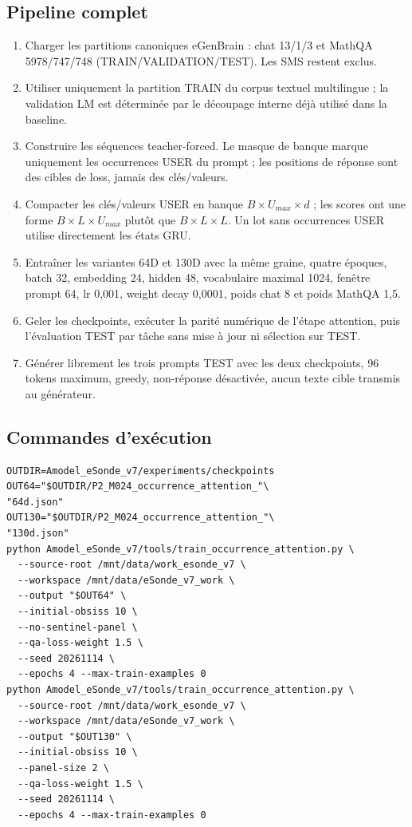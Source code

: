 \documentclass[11pt,a4paper]{report}
\begin{document}
\subsection*{Pipeline complet}
\begin{enumerate}
\item Charger les partitions canoniques eGenBrain : chat 13/1/3 et MathQA 5978/747/748 (TRAIN/VALIDATION/TEST). Les SMS restent exclus.
\item Utiliser uniquement la partition TRAIN du corpus textuel multilingue ; la validation LM est déterminée par le découpage interne déjà utilisé dans la baseline.
\item Construire les séquences teacher-forced. Le masque de banque marque uniquement les occurrences USER du prompt ; les positions de réponse sont des cibles de loss, jamais des clés/valeurs.
\item Compacter les clés/valeurs USER en banque $B\times U_{max}\times d$ ; les scores ont une forme $B\times L\times U_{max}$ plutôt que $B\times L\times L$. Un lot sans occurrences USER utilise directement les états GRU.
\item Entraîner les variantes 64D et 130D avec la même graine, quatre époques, batch 32, embedding 24, hidden 48, vocabulaire maximal 1024, fenêtre prompt 64, lr 0,001, weight decay 0,0001, poids chat 8 et poids MathQA 1,5.
\item Geler les checkpoints, exécuter la parité numérique de l'étape attention, puis l'évaluation TEST par tâche sans mise à jour ni sélection sur TEST.
\item Générer librement les trois prompts TEST avec les deux checkpoints, 96 tokens maximum, greedy, non-réponse désactivée, aucun texte cible transmis au générateur.
\end{enumerate}

\subsection*{Commandes d'exécution}
\begin{verbatim}
OUTDIR=Amodel_eSonde_v7/experiments/checkpoints
OUT64="$OUTDIR/P2_M024_occurrence_attention_"\
"64d.json"
OUT130="$OUTDIR/P2_M024_occurrence_attention_"\
"130d.json"
python Amodel_eSonde_v7/tools/train_occurrence_attention.py \
  --source-root /mnt/data/work_esonde_v7 \
  --workspace /mnt/data/eSonde_v7_work \
  --output "$OUT64" \
  --initial-obsiss 10 \
  --no-sentinel-panel \
  --qa-loss-weight 1.5 \
  --seed 20261114 \
  --epochs 4 --max-train-examples 0
python Amodel_eSonde_v7/tools/train_occurrence_attention.py \
  --source-root /mnt/data/work_esonde_v7 \
  --workspace /mnt/data/eSonde_v7_work \
  --output "$OUT130" \
  --initial-obsiss 10 \
  --panel-size 2 \
  --qa-loss-weight 1.5 \
  --seed 20261114 \
  --epochs 4 --max-train-examples 0
\end{verbatim}
\end{document}
